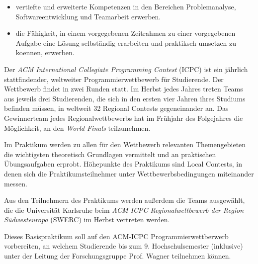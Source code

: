 \begin{module}
\begin{learningoutcomes}
 \begin{itemize}\item vertiefte und erweiterte Kompetenzen in den Bereichen Problemanalyse, Softwareentwicklung und Teamarbeit erwerben.  \item die Fähigkeit, in einem vorgegebenen Zeitrahmen zu einer vorgegebenen Aufgabe eine Lösung selbständig erarbeiten und praktiksch umsetzen zu koennen, erwerben.  \end{itemize}
\end{learningoutcomes}

\begin{content}
Der \emph{ACM International Collegiate Programming Contest} (ICPC) ist ein jährlich stattfindender, weltweiter Programmierwettbewerb für Studierende. Der Wettbewerb findet in zwei Runden statt. Im Herbst jedes Jahres treten Teams aus jeweils drei Studierenden, die sich in den ersten vier Jahren ihres Studiums befinden müssen, in weltweit 32 Regional Contests gegeneinander an. Das Gewinnerteam jedes Regionalwettbewerbs hat im Frühjahr des Folgejahres die Möglichkeit, an den \emph{World Finals} teilzunehmen.

 

Im Praktikum werden zu allen für den Wettbewerb relevanten Themengebieten die wichtigsten theoretisch Grundlagen vermittelt und an praktischen Übungsaufgaben erprobt. Höhepunkte des Praktikums sind Local Contests, in denen sich die Praktikumsteilnehmer unter Wettbewerbsbedingungen miteinander messen.

 

Aus den Teilnehmern des Praktikums werden außerdem die Teams ausgewählt, die die Universität Karlsruhe beim \emph{ACM ICPC Regionalwettbewerb der Region Südwesteuropa} (SWERC) im Herbst vertreten werden.


\end{content}

\begin{remarks}Dieses Basispraktikum soll auf den ACM-ICPC Programmierwettberwerb vorbereiten, an welchem Studierende bis zum 9. Hochschulsemester (inklusive) unter der Leitung der Forschungsgruppe Prof. Wagner teilnehmen können.

\end{remarks}

\end{module}

